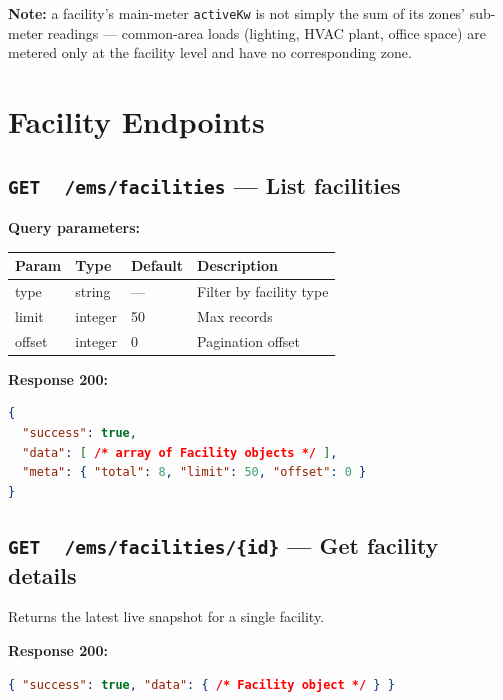 \documentclass{article}
\newcommand{\GET}{\colorbox{evblue!20}{\texttt{\textbf{\color{evblue}GET}}}}
\begin{document}
\noindent\textbf{Note:} a facility's main-meter \texttt{activeKw} is not simply
the sum of its zones' sub-meter readings --- common-area loads (lighting,
HVAC plant, office space) are metered only at the facility level and have no
corresponding zone.

\newpage

\section{Facility Endpoints}

\subsection{\GET\ \ \texttt{/ems/facilities} --- List facilities}

\textbf{Query parameters:}

\begin{center}
\begin{tabular}{>{\ttfamily}llll}
\toprule
\textbf{Param} & \textbf{Type} & \textbf{Default} & \textbf{Description}\\
\midrule
type    & string  & ---    & Filter by facility type\\
limit   & integer & 50   & Max records\\
offset  & integer & 0    & Pagination offset\\
\bottomrule
\end{tabular}
\end{center}

\textbf{Response 200:}
\begin{lstlisting}[language=json]
{
  "success": true,
  "data": [ /* array of Facility objects */ ],
  "meta": { "total": 8, "limit": 50, "offset": 0 }
}
\end{lstlisting}

\subsection{\GET\ \ \texttt{/ems/facilities/\{id\}} --- Get facility details}

Returns the latest live snapshot for a single facility.

\textbf{Response 200:}
\begin{lstlisting}[language=json]
{ "success": true, "data": { /* Facility object */ } }
\end{lstlisting}
\end{document}
